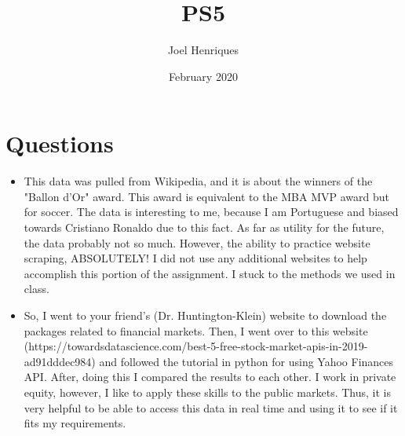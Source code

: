 \documentclass{article}
\title{PS5}
\author{Joel Henriques }
\date{February 2020}
\begin{document}
\maketitle

\section{Questions}
\begin{itemize}
    \item This data was pulled from Wikipedia, and it is about the winners of the "Ballon d'Or" award. This award is equivalent to the MBA MVP award but for soccer. The data is interesting to me, because I am Portuguese and biased towards Cristiano Ronaldo due to this fact. As far as utility for the future, the data probably not so much. However, the ability to practice website scraping, ABSOLUTELY! I did not use any additional websites to help accomplish this portion of the assignment. I stuck to the methods we used in class. 
    \item So, I went to your friend's (Dr. Huntington-Klein) website to download the packages related to financial markets. Then, I went over to this website (https://towardsdatascience.com/best-5-free-stock-market-apis-in-2019-ad91dddec984) and followed the tutorial in python for using Yahoo Finances API. After, doing this I compared the results to each other. I work in private equity, however, I like to apply these skills to the public markets. Thus, it is very helpful to be able to access this data in real time and using it to see if it fits my requirements. 
\end{itemize}
\end{document}
